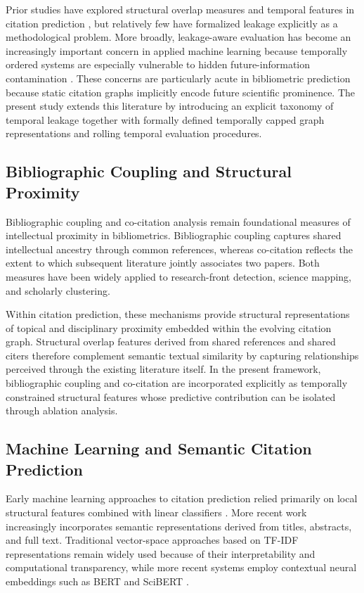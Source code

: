\documentclass[11pt,a4paper]{article}
\begin{document}
Prior studies have explored structural overlap measures and temporal features in citation prediction \citep{shibata2012link, chakraborty2015towards}, but relatively few have formalized leakage explicitly as a methodological problem. More broadly, leakage-aware evaluation has become an increasingly important concern in applied machine learning because temporally ordered systems are especially vulnerable to hidden future-information contamination \citep{fortunato2018science}. These concerns are particularly acute in bibliometric prediction because static citation graphs implicitly encode future scientific prominence. The present study extends this literature by introducing an explicit taxonomy of temporal leakage together with formally defined temporally capped graph representations and rolling temporal evaluation procedures.

\subsection{Bibliographic Coupling and Structural Proximity}

Bibliographic coupling \citep{kessler1963bibliographic} and co-citation analysis \citep{small1973co} remain foundational measures of intellectual proximity in bibliometrics. Bibliographic coupling captures shared intellectual ancestry through common references, whereas co-citation reflects the extent to which subsequent literature jointly associates two papers. Both measures have been widely applied to research-front detection, science mapping, and scholarly clustering.

Within citation prediction, these mechanisms provide structural representations of topical and disciplinary proximity embedded within the evolving citation graph. Structural overlap features derived from shared references and shared citers therefore complement semantic textual similarity by capturing relationships perceived through the existing literature itself. In the present framework, bibliographic coupling and co-citation are incorporated explicitly as temporally constrained structural features whose predictive contribution can be isolated through ablation analysis.

\subsection{Machine Learning and Semantic Citation Prediction}

Early machine learning approaches to citation prediction relied primarily on local structural features combined with linear classifiers \citep{liben2007link}. More recent work increasingly incorporates semantic representations derived from titles, abstracts, and full text. Traditional vector-space approaches based on TF-IDF representations remain widely used because of their interpretability and computational transparency, while more recent systems employ contextual neural embeddings such as BERT and SciBERT \citep{devlin2019bert}.
\end{document}

